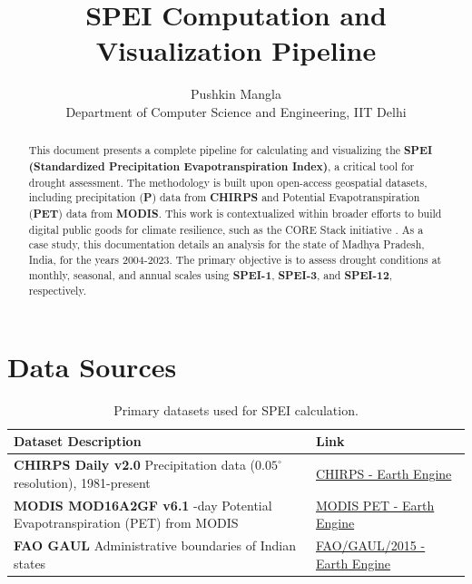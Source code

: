 \documentclass[12pt, a4paper]{article}
\title{\huge\textbf{SPEI Computation and Visualization Pipeline}}
\author{\large Pushkin Mangla \\ \large Department of Computer Science and Engineering, IIT Delhi}
\date{}
\begin{document}
\maketitle
\tableofcontents
\newpage

\begin{abstract}
    \noindent This document presents a complete pipeline for calculating and visualizing the \textbf{SPEI (Standardized Precipitation Evapotranspiration Index)}, a critical tool for drought assessment. The methodology is built upon open-access geospatial datasets, including precipitation (\textbf{P}) data from \textbf{CHIRPS} and Potential Evapotranspiration (\textbf{PET}) data from \textbf{MODIS}. This work is contextualized within broader efforts to build digital public goods for climate resilience, such as the CORE Stack initiative \cite{seth2024core}.
    \newline\newline
    As a case study, this documentation details an analysis for the state of Madhya Pradesh, India, for the years 2004-2023. The primary objective is to assess drought conditions at monthly, seasonal, and annual scales using \textbf{SPEI-1}, \textbf{SPEI-3}, and \textbf{SPEI-12}, respectively.
\end{abstract}

\section{Data Sources}

\begin{table}[h!]
    \centering
    \caption{Primary datasets used for SPEI calculation.}
    \begin{tabular}{p{6cm} p{6cm}}
        \toprule
        \textbf{Dataset Description} & \textbf{Link} \\
        \midrule
        \textbf{CHIRPS Daily v2.0} \newline Precipitation data ($0.05^{\circ}$ resolution), 1981-present & \href{https://developers.google.com/earth-engine/datasets/catalog/UCSB-CHG_CHIRPS_DAILY}{CHIRPS - Earth Engine} \\
        \addlinespace
        \textbf{MODIS MOD16A2GF v6.1} \newline 8-day Potential Evapotranspiration (PET) from MODIS & \href{https://developers.google.com/earth-engine/datasets/catalog/MODIS_061_MOD16A2GF}{MODIS PET - Earth Engine} \\
        \addlinespace
        \textbf{FAO GAUL} \cite{fao2015gaul} \newline Administrative boundaries of Indian states & \href{https://developers.google.com/earth-engine/datasets/catalog/FAO_GAUL_2015_level1}{FAO/GAUL/2015 - Earth Engine} \\
        \bottomrule
    \end{tabular}
\end{table}
\end{document}
